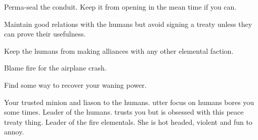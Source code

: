\documentclass[char]{elementals}
\begin{document}
\begin{itemz}[Goals]
	\item  Perma-seal the conduit. Keep it from opening in the mean time if you can.
	\item  Maintain good relations with the humans but avoid signing a treaty unless they can prove their usefulness.
	\item  Keep the humans from making alliances with any other elemental faction.
	\item  Blame fire for the airplane crash.
	\item  Find some way to recover your waning power.
\end{itemz}

\begin{contacts}
	\contact{\cNaturalist{\intro}} Your trusted minion and liason to the humans. \cNaturalist{\Their} utter focus on humans bores you some times.
	\contact{\cLeader{\intro}} Leader of the humans. \cLeader{\They} trusts you but is obsessed with this peace treaty thing.
	\contact{\cQueen{\intro}} Leader of the fire elementals. She is hot headed, violent and fun to annoy.
	
	
\end{contacts} 
\end{document}
